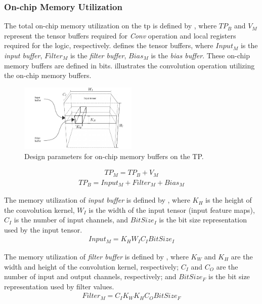 \subsubsection{On-chip Memory Utilization}
\label{sec:memory_utilization}
The total on-chip memory utilization on the \gls{tp} is defined by , where $TP_B$ and $V_{M}$ represent the tensor buffers required for \emph{Conv} operation and local registers required for the logic, respectively.  defines the tensor buffers, where $Input_{M}$ is the \emph{input buffer}, $Filter_{M}$ is the \emph{filter buffer}, $Bias_{M}$ is the \emph{bias buffer}. These on-chip memory buffers are defined in bits.  illustrates the convolution operation utilizing the on-chip memory buffers.
\begin{figure}
	\centering
	\includegraphics[width=0.5\textwidth]{./chapters/cnn_accelerator/figures/accelerator_buffers.pdf}
	\caption{Design parameters for on-chip memory buffers on the TP.}
	\label{fig:accelerator_buffers}
\end{figure}
\begin{eqnarray} \label{eq:tp_memory}
TP_{M}=TP_B+V_{M}
\end{eqnarray}
\begin{eqnarray} \label{eq:tp_memory_buffer}
TP_{B}=Input_{M}+Filter_{M}+Bias_{M}
\end{eqnarray}

The memory utilization of \emph{input buffer} is defined by , where $K_{H}$ is the height of the convolution kernel, $W_{I}$ is the width of the input tensor (input feature maps), $C_{I}$ is the number of input channels, and $BitSize_{I}$ is the bit size representation used by the input tensor.
\begin{eqnarray} \label{eq:input_memory}
Input_{M}=K_{H}W_{I}C_{I}BitSize_{I}
\end{eqnarray}

The memory utilization of \emph{filter buffer} is defined by , where $K_{W}$ and $K_{H}$ are the width and height of the convolution kernel, respectively; $C_{I}$ and $C_{O}$ are the number of input and output channels, respectively; and $BitSize_{F}$ is the bit size representation used by filter values.
\begin{eqnarray} \label{eq:filter_memory}
Filter_{M}=C_{I}K_{W}K_{H}C_{O}BitSize_{F}
\end{eqnarray}

